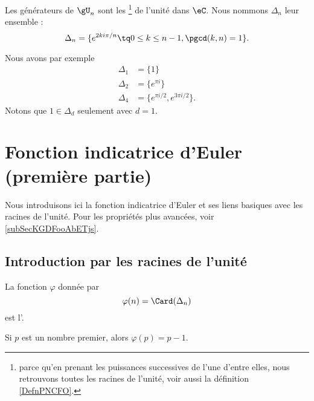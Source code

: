 \begin{definition}\label{DefLYGTooFPOYGZ}
    Les générateurs de \( \gU_n\) sont les \footnote{parce qu'en prenant les puissances successives de l'une d'entre elles, nous retrouvons toutes les racines de l'unité, voir aussi la définition \ref{DefnPNCFO}.} de l'unité dans \( \eC\). Nous nommons \( \Delta_n\) leur ensemble :
\begin{equation}
    \Delta_n=\{  e^{2ki\pi/n}\tq 0\leq k\leq n-1,\pgcd(k,n)=1 \}.
\end{equation}
\end{definition}
Nous avons par exemple
\begin{subequations}
    \begin{align}
        \Delta_1&=\{ 1 \}\\
        \Delta_2&=\{  e^{\pi i} \}\\
        \Delta_4&=\{  e^{\pi i/2}, e^{3\pi i/2} \}.
    \end{align}
\end{subequations}
Notons que \( 1\in \Delta_d\) seulement avec \( d=1\).


\section{Fonction indicatrice d'Euler (première partie)}

Nous introduisons ici la fonction indicatrice d'Euler et ses liens basiques avec les racines de l'unité. Pour les propriétés plus avancées, voir \ref{subSecKGDFooAbETjs}.

\subsection{Introduction par les racines de l'unité}

\begin{definition}
La fonction \( \varphi\) donnée par
\begin{equation}    \label{EqEulerGqPsvi}
    \varphi(n)=\Card(\Delta_n)
\end{equation}
est l'.
\end{definition}
Si \( p\) est un nombre premier, alors \( \varphi(p)=p-1\).

